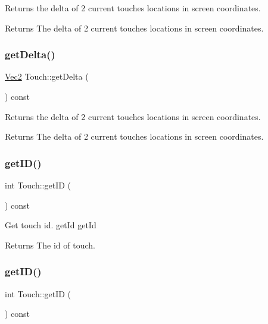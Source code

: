 Returns the delta of 2 current touches locations in screen coordinates.

\begin{DoxyReturn}{Returns}
The delta of 2 current touches locations in screen coordinates. 
\end{DoxyReturn}
\mbox{\label{classTouch_a386d29f52c790a8b5232a1e248390aa7}} 
\subsubsection{\texorpdfstring{get\+Delta()}{getDelta()}\hspace{0.1cm}{\footnotesize\ttfamily [2/2]}}
{\footnotesize\ttfamily \hyperlink{classVec2}{Vec2} Touch\+::get\+Delta (\begin{DoxyParamCaption}{ }\end{DoxyParamCaption}) const}

Returns the delta of 2 current touches locations in screen coordinates.

\begin{DoxyReturn}{Returns}
The delta of 2 current touches locations in screen coordinates. 
\end{DoxyReturn}
\mbox{\label{classTouch_a68fe0fa8c82e12d4b718989a3064ebea}} 
\subsubsection{\texorpdfstring{get\+I\+D()}{getID()}\hspace{0.1cm}{\footnotesize\ttfamily [1/2]}}
{\footnotesize\ttfamily int Touch\+::get\+ID (\begin{DoxyParamCaption}{ }\end{DoxyParamCaption}) const\hspace{0.3cm}{\ttfamily [inline]}}

Get touch id.  get\+Id  get\+Id

\begin{DoxyReturn}{Returns}
The id of touch. 
\end{DoxyReturn}
\mbox{\label{classTouch_a68fe0fa8c82e12d4b718989a3064ebea}} 
\subsubsection{\texorpdfstring{get\+I\+D()}{getID()}\hspace{0.1cm}{\footnotesize\ttfamily [2/2]}}
{\footnotesize\ttfamily int Touch\+::get\+ID (\begin{DoxyParamCaption}{ }\end{DoxyParamCaption}) const\hspace{0.3cm}{\ttfamily [inline]}}

